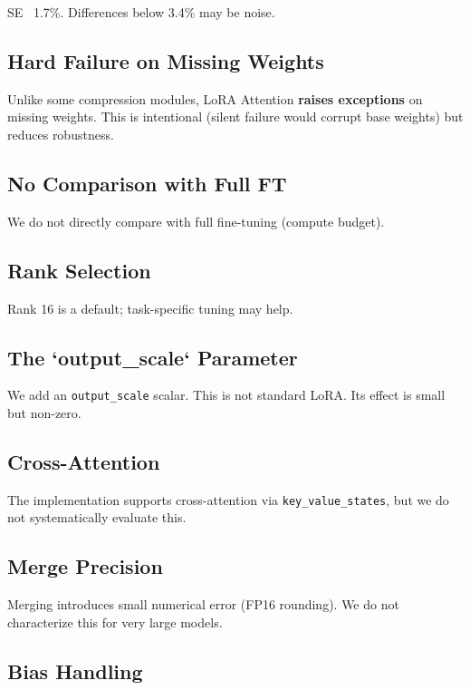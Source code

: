 SE ~1.7\%. Differences below 3.4\% may be noise.

\subsection{Hard Failure on Missing Weights}

Unlike some compression modules, LoRA Attention \textbf{raises exceptions} on 
missing weights. This is intentional (silent failure would corrupt base 
weights) but reduces robustness.

\subsection{No Comparison with Full FT}

We do not directly compare with full fine-tuning (compute budget). 

\subsection{Rank Selection}

Rank 16 is a default; task-specific tuning may help.

\subsection{The `output\_scale` Parameter}

We add an \texttt{output\_scale} scalar. This is not standard LoRA. Its effect is 
small but non-zero.

\subsection{Cross-Attention}

The implementation supports cross-attention via \texttt{key\_value\_states}, but 
we do not systematically evaluate this.

\subsection{Merge Precision}

Merging introduces small numerical error (FP16 rounding). We do not 
characterize this for very large models.

\subsection{Bias Handling}

